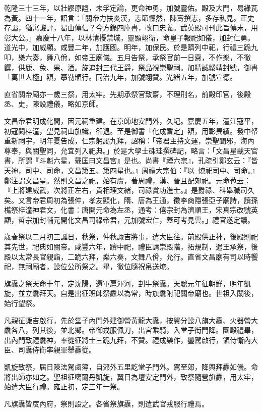 \begin{pinyinscope}
乾隆三十三年，以壯繆原謚，未孚定論，更命神勇，加號靈佑。殿及大門，易綠瓦為黃。四十一年，詔言：「關帝力扶炎漢，志節懍然，陳壽撰志，多存私見。正史存謚，猶寓譏評，曷由傳信？今方錄四庫書，改曰忠義。武英殿可刊此旨傳末，用彰大公。」嘉慶十八年，以林清擾禁城，靈顯翊衛，命皇子報祀如儀，加封仁勇。道光中，加威顯。咸豐二年，加護國。明年，加保民。於是躋列中祀，行禮三跪九叩，樂六奏，舞八佾，如帝王廟儀。五月告祭，承祭官前一日齋，不作樂，不徹饌，供鹿、兔、果、酒。旋追封三代王爵，祭品視崇聖祠。加精誠綏靖封號，御書「萬世人極」額，摹勒頒行。同治九年，加號翊贊。光緒五年，加號宣德。

直省關帝廟亦一歲三祭，用太牢。先期承祭官致齋，不理刑名，前殿印官，後殿丞、史，陳設禮儀，略如京師。

文昌帝君明成化間，因元祠重建。在京師地安門外，久圮。嘉慶五年，潼江寇平，初寇闚梓潼，望見祠山旗幟，卻退。至是御書「化成耆定」額，用彰異績。發中帑重新祠宇，明年夏告成，仁宗躬謁九拜，詔稱：「帝君主持文運，崇聖闢邪，海內尊奉，與關聖同，允宜列入祀典。」於是大學士硃珪撰碑記，略言：「文昌星載天官書，所謂『斗魁六星，戴匡曰文昌宮』是也。尚書『禋六宗』，孔疏引鄭玄云：『皆天神，司中、司命，文昌第五、第四星也。』周禮大宗伯：『以燎祀司中、司命。』鄭注謂文昌星。然則文昌之祀，始有虞，著周禮，漢、晉且配郊祀。元命苞云：『上將建威武，次將正左右，貴相理文緒，司祿賞功進士。』是爵祿、科舉職司久矣。又言帝君周初為張仲，孝友顯化，隋、唐為王通，徵李商隱張亞子廟詩，讀孫樵祭梓潼神君文，化書：唐開元命為左丞，通考：僖宗封為濟順王，宋真宗改號英顯，哲宗加封輔元開化文昌司祿帝君，元加號宏仁，蓋可考見雲。」禮官遂定議。

歲春祭以二月初三誕日，秋祭，仲秋諏吉將事，遣大臣往。前殿供正神，後殿則祀其先世，祀典如關帝。咸豐六年，躋中祀，禮臣請崇殿階，拓規制，遣王承祭，後殿以太常長官親詣，二跪六拜，樂六奏，文舞八佾，允行。直省文昌廟有司以時饗祀，無祠廟者，設位公所祭之。畢，徹位隨祝帛送燎。

旗纛之祭天命十年，定沈陽，還軍扈渾河，刲牛祭纛。天聰元年征朝鮮，明年凱旋，並立纛拜天。自是出征班師祭纛以為常，時旗纛附祀關帝廟也。世祖入關後，始行望祭。

凡親征諏吉啟行，先於堂子內門外建御營黃龍大纛，按翼分設八旗大纛、火器營大纛各八，列其後，並北鄉。帝御戎服佩刀，出宮乘騎，入堂子街門降。圜殿禮畢，出內門致禮纛神，率從征將士三跪九拜，不贊。禮成樂作，鑾駕啟行，領侍衛內大臣、司纛侍衛率親軍舉纛從。

凱旋致祭，屆日陳法駕鹵簿，自郊外五里訖堂子門外。駕至郊，降輿拜纛如儀。命將出師亦如之。聖祖征噶爾丹凱旋，翼日為壇安定門外，致祭隨營旗纛，用太牢，始遣大臣行禮。雍正初，定三年一祭。

凡旗纛皆庋內府，祭則設之。各省祭旗纛，則遣武官戎服行禮焉。


\end{pinyinscope}
